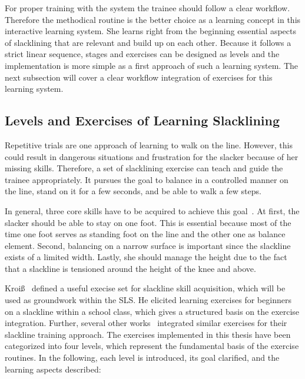 For proper training with the system the trainee should follow a clear workflow. Therefore the methodical routine is the better choice as a learning concept in this interactive learning system. She learns right from the beginning essential aspects of slacklining that are relevant and build up on each other. Because it follows a strict linear sequence, stages and exercises can be designed as levels and the implementation is more simple as a first approach of such a learning system. 
The next subsection \textit{} will cover a clear workflow integration of exercises for this learning system.

\subsection{Levels and Exercises of Learning Slacklining}\label{3_3_2_StagesExercises}
Repetitive trials are one approach of learning to walk on the line. However, this could result in dangerous situations and frustration for the slacker because of her missing skills. Therefore, a set of slacklining exercise can teach and guide the trainee appropriately. It pursues the goal to balance in a controlled manner on the line, stand on it for a few seconds, and be able to walk a few steps. 

In general, three core skills have to be acquired to achieve this goal~\cite{Kroiss2007-ab}. At first, the slacker should be able to stay on one foot. This is essential because most of the time one foot serves as standing foot on the line and the other one as balance element. Second, balancing on a narrow surface is important since the slackline exists of a limited width. Lastly, she should manage the height due to the fact that a slackline is tensioned around the height of the knee and above.

Kroiß~\cite{Kroiss2007-ab} defined a useful execise set for slackline skill acquisition, which will be used as groundwork within the SLS. He elicited learning exercises for beginners on a slackline within a school class, which gives a structured basis on the exercise integration. Further, several other works~\cite{Balcom2005-wl, Donath2013-kk, Donath2016-gm, Granacher2010-ow, Keller2012-xh, Kleindl2011-bl, Pfusterschmied2013-yy, Thomann2013-aa} integrated similar exercises for their slackline training approach. The exercises implemented in this thesis have been categorized into four levels, which represent the fundamental basis of the exercise routines. In the following, each level is introduced, its goal clarified, and the learning aspects described:

